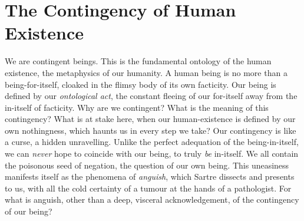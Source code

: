 \chapter{The Contingency of Human Existence}


We are contingent beings. This is the fundamental ontology of the human existence, the metaphysics of our humanity. A human being is no more than a being-for-itself, cloaked in the flimsy body of its own facticity. Our being is defined by our \emph{ontological act}, the constant fleeing of our for-itself away from the in-itself of facticity. Why are we contingent? What is the meaning of this contingency? What is at stake here, when our human-existence is defined by our own nothingness, which haunts us in every step we take? Our contingency is like a curse, a hidden unravelling. Unlike the perfect adequation of the being-in-itself, we can \emph{never} hope to coincide with our being, to truly \emph{be} in-itself. We all contain the poisonous seed of negation, the question of our own being. This uneasiness manifests itself as the phenomena of \emph{anguish}, which Sartre dissects and presents to us, with all the cold certainty of a tumour at the hands of a pathologist. For what is anguish, other than a deep, visceral acknowledgement, of the contingency of our being?





% 

